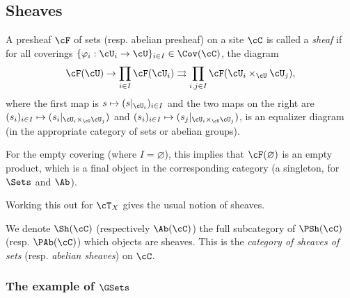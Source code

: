 \subsection{Sheaves}

\begin{defi}
A presheaf $\cF$ of sets (resp. abelian presheaf) on a site $\cC$ is called a \emph{sheaf} if for all coverings $\{\varphi_i : \cU_i \to \cU \}_{i\in I} \in \Cov (\cC)$, the diagram
$$\label{sheafaxiom}
\cF(\cU) \to \prod_{i\in I} \cF(\cU_i) \rightrightarrows \prod_{i,j \in I} \cF(\cU_i \times_\cU \cU_j),
$$ 
where the first map is $s \mapsto (s|_{\cU_i})_{i\in I}$ and the two maps on the right are $(s_i)_{i\in I} \mapsto (s_i |_{\cU_i \times_\cU \cU_j})$ and $(s_i)_{i\in I} \mapsto (s_j |_{\cU_i \times_\cU \cU_j})$, is an equalizer diagram (in the appropriate category of sets or abelian groups). 
\end{defi}

\begin{remark}
For the empty covering (where $I = \varnothing$), this implies that $\cF(\varnothing)$ is an empty product, which is a final object in the corresponding category (a singleton, for $\Sets$ and $\Ab$).
\end{remark}

\begin{example}
Working this out for $\cT_X$ gives the usual notion of sheaves.
\end{example}

\begin{defi}
We denote $\Sh(\cC)$ (respectively $\Ab(\cC)$) the full subcategory of $\PSh(\cC)$ (resp. $\PAb(\cC)$) which objects are sheaves. This is the \emph{category of sheaves of sets} (resp. \emph{abelian sheaves}) on $\cC$.
\end{defi}

\subsubsection{The example of $\GSets$}
\label{subsubsection:GSets}

